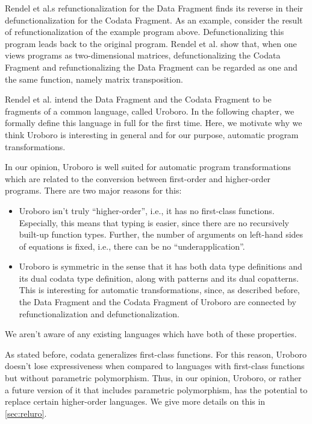 Rendel et al.s\cite{rendel15automatic} refunctionalization for the Data Fragment finds its reverse in their defunctionalization for the Codata Fragment. As an example, consider the result of refunctionalization of the example program above. Defunctionalizing this program leads back to the original program. Rendel et al. show that, when one views programs as two-dimensional matrices, defunctionalizing the Codata Fragment and refunctionalizing the Data Fragment can be regarded as one and the same function, namely matrix transposition.

Rendel et al. intend the Data Fragment and the Codata Fragment to be fragments of a common language, called Uroboro. In the following chapter, we formally define this language in full for the first time. Here, we motivate why we think Uroboro is interesting in general and for our purpose, automatic program transformations.

In our opinion, Uroboro is well suited for automatic program transformations which are related to the conversion between first-order and higher-order programs. There are two major reasons for this:
\begin{itemize}
\item Uroboro isn't truly ``higher-order'', i.e., it has no first-class functions. Especially, this means that typing is easier, since there are no recursively built-up function types. Further, the number of arguments on left-hand sides of equations is fixed, i.e., there can be no ``underapplication''.

\item Uroboro is symmetric in the sense that it has both data type definitions and its dual codata type definition, along with patterns and its dual copatterns. This is interesting for automatic transformations, since, as described before, the Data Fragment and the Codata Fragment of Uroboro are connected by refunctionalization and defunctionalization.
\end{itemize}
We aren't aware of any existing languages which have both of these properties.

As stated before, codata generalizes first-class functions. For this reason, Uroboro doesn't lose expressiveness when compared to languages with first-class functions but without parametric polymorphism. Thus, in our opinion, Uroboro, or rather a future version of it that includes parametric polymorphism, has the potential to replace certain higher-order languages. We give more details on this in \autoref{sec:reluro}.

